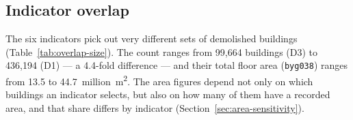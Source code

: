 \subsection{Indicator overlap}\label{sec:overlap}
The six indicators pick out very different sets of demolished buildings
(Table~\ref{tab:overlap-size}). The count ranges from 99{,}664 buildings
(D3) to 436{,}194 (D1) --- a 4.4-fold difference --- and their total floor
area (\texttt{byg038}) ranges from 13.5 to 44.7~million~m\textsuperscript{2}.
The area figures depend not only on which buildings an indicator selects,
but also on how many of them have a recorded area, and that share differs
by indicator (Section~\ref{sec:area-sensitivity}).

